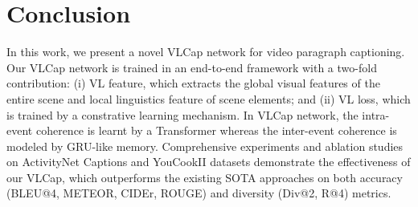 \documentclass{article}
\begin{document}
\vspace{-4mm}
\section{Conclusion}
\vspace{-1mm}
In this work, we present a novel VLCap network for video paragraph captioning. Our VLCap network is trained in an end-to-end framework with a two-fold contribution: (i) VL feature, which extracts the global visual features of the entire scene and local linguistics feature of scene elements; and (ii) VL loss, which is trained by a constrative learning mechanism. In VLCap network, the intra-event coherence is learnt by a Transformer whereas the inter-event coherence is modeled by GRU-like memory. Comprehensive experiments and ablation studies on ActivityNet Captions and YouCookII datasets demonstrate the effectiveness of our VLCap, which outperforms the existing SOTA approaches on both accuracy (BLEU@4, METEOR, CIDEr, ROUGE) and diversity (Div@2, R@4) metrics.








\small


\end{document}
